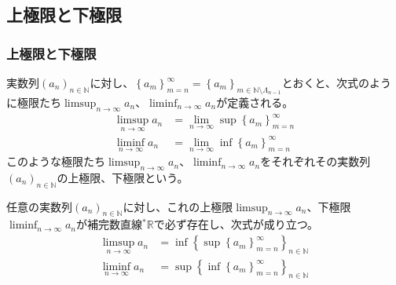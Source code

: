 \documentclass[dvipdfmx]{jsarticle}
\begin{document}
\subsection{上極限と下極限}%
\subsubsection{上極限と下極限}%
\begin{dfn}
実数列$\left( a_{n} \right)_{n \in \mathbb{N}}$に対し、$\left\{ a_{m} \right\}_{m = n}^{\infty} = \left\{ a_{m} \right\}_{m \in \mathbb{N} \setminus \varLambda_{n - 1}}$とおくと、次式のように極限たち$\limsup_{n \rightarrow \infty}a_{n}$、$\liminf_{n \rightarrow \infty}a_{n}$が定義される。
\begin{align*}
\limsup_{n \rightarrow \infty}a_{n} &= \lim_{n \rightarrow \infty}{\sup\left\{ a_{m} \right\}_{m = n}^{\infty}}\\
\liminf_{n \rightarrow \infty}a_{n} &= \lim_{n \rightarrow \infty}{\inf\left\{ a_{m} \right\}_{m = n}^{\infty}}
\end{align*}
このような極限たち$\limsup_{n \rightarrow \infty}a_{n}$、$\liminf_{n \rightarrow \infty}a_{n}$をそれぞれその実数列$\left( a_{n} \right)_{n \in \mathbb{N}}$の上極限、下極限という。
\end{dfn}
\begin{thm}\label{4.1.6.1}
任意の実数列$\left( a_{n} \right)_{n \in \mathbb{N}}$に対し、これの上極限$\limsup_{n \rightarrow \infty}a_{n}$、下極限$\liminf_{n \rightarrow \infty}a_{n}$が補完数直線${}^{*}\mathbb{R}$で必ず存在し、次式が成り立つ。
\begin{align*}
\limsup_{n \rightarrow \infty}a_{n} &= \inf\left\{ \sup\left\{ a_{m} \right\}_{m = n}^{\infty} \right\}_{n \in \mathbb{N}}\\
\liminf_{n \rightarrow \infty}a_{n} &= \sup\left\{ \inf\left\{ a_{m} \right\}_{m = n}^{\infty} \right\}_{n \in \mathbb{N}}
\end{align*}
\end{thm}
\end{document}

